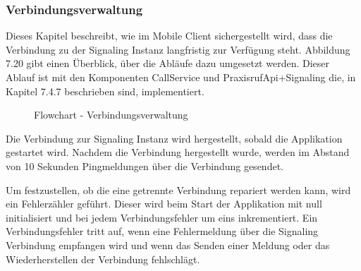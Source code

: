 \subsubsection{Verbindungsverwaltung}

Dieses Kapitel beschreibt, wie im Mobile Client sichergestellt wird, dass die Verbindung zu der Signaling Instanz langfristig zur Verfügung steht.
Abbildung 7.20 gibt einen Überblick, über die Abläufe dazu umgesetzt werden.
Dieser Ablauf ist mit den Komponenten CallService und PraxisrufApi+Signaling die, in Kapitel 7.4.7 beschrieben sind, implementiert.

\begin{figure}[h]
    \centering
    \begin{minipage}[b]{1\textwidth}
        \caption{Flowchart - Verbindungsverwaltung}
    \end{minipage}
\end{figure}

Die Verbindung zur Signaling Instanz wird hergestellt, sobald die Applikation gestartet wird.
Nachdem die Verbindung hergestellt wurde, werden im Abstand von 10 Sekunden Pingmeldungen über die Verbindung gesendet.

Um festzustellen, ob die eine getrennte Verbindung repariert werden kann, wird ein Fehlerzähler geführt.
Dieser wird beim Start der Applikation mit null initialisiert und bei jedem Verbindungsfehler um eins inkrementiert.
Ein Verbindungsfehler tritt auf, wenn eine Fehlermeldung über die Signaling Verbindung empfangen wird und wenn das Senden einer Meldung oder das Wiederherstellen der Verbindung fehlschlägt.

